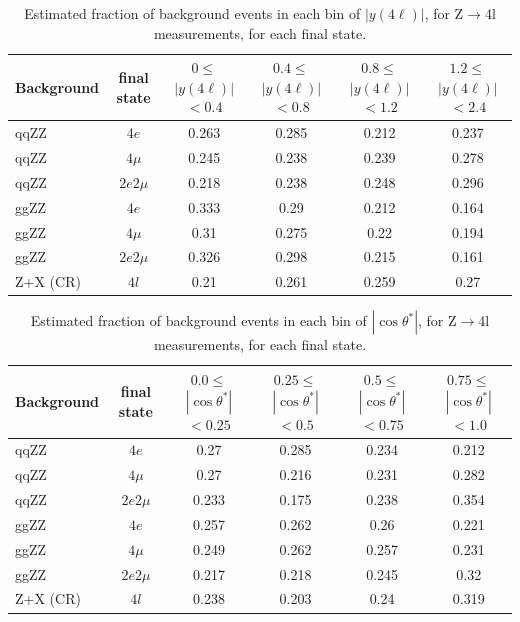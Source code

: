 \begin{table}[!h!tb]  
\begin{center}  
\small  
    \caption{  
        Estimated fraction of background events in each bin of $|y(4\ell)|$, for Z$\to$4l measurements, for each final state.  
\label{tab:z4l_fractions_rapidity4l}  
}  
\begin{tabular}{|l|c|c|c|c|c|}  
\hline  
Background & final state & $0\leq$$|y(4\ell)|$$<0.4$ & $0.4\leq$$|y(4\ell)|$$<0.8$ & $0.8\leq$$|y(4\ell)|$$<1.2$ & $1.2\leq$$|y(4\ell)|$$<2.4$ \\ \hline  
qqZZ& $4e$  & 0.263 & 0.285 & 0.212 & 0.237  \\
qqZZ& $4\mu$  & 0.245 & 0.238 & 0.239 & 0.278  \\
qqZZ& $2e2\mu$  & 0.218 & 0.238 & 0.248 & 0.296  \\
ggZZ& $4e$  & 0.333 & 0.29 & 0.212 & 0.164  \\
ggZZ& $4\mu$  & 0.31 & 0.275 & 0.22 & 0.194  \\
ggZZ& $2e2\mu$  & 0.326 & 0.298 & 0.215 & 0.161  \\
Z+X (CR)& $4l$  & 0.21 & 0.261 & 0.259 & 0.27  \\
\hline  
\end{tabular}  
\normalsize  
\end{center}  
\end{table}  

\begin{table}[!h!tb]  
\begin{center}  
\small  
    \caption{  
        Estimated fraction of background events in each bin of $|\cos \theta^{*}|$, for Z$\to$4l measurements, for each final state.  
\label{tab:z4l_fractions_cosThetaStar}  
}  
\begin{tabular}{|l|c|c|c|c|c|}  
\hline  
Background & final state & $0.0\leq$$|\cos \theta^{*}|$$<0.25$ & $0.25\leq$$|\cos \theta^{*}|$$<0.5$ & $0.5\leq$$|\cos \theta^{*}|$$<0.75$ & $0.75\leq$$|\cos \theta^{*}|$$<1.0$ \\ \hline  
qqZZ& $4e$  & 0.27 & 0.285 & 0.234 & 0.212  \\
qqZZ& $4\mu$  & 0.27 & 0.216 & 0.231 & 0.282  \\
qqZZ& $2e2\mu$  & 0.233 & 0.175 & 0.238 & 0.354  \\
ggZZ& $4e$  & 0.257 & 0.262 & 0.26 & 0.221  \\
ggZZ& $4\mu$  & 0.249 & 0.262 & 0.257 & 0.231  \\
ggZZ& $2e2\mu$  & 0.217 & 0.218 & 0.245 & 0.32  \\
Z+X (CR)& $4l$  & 0.238 & 0.203 & 0.24 & 0.319  \\
\hline  
\end{tabular}  
\normalsize  
\end{center}  
\end{table} 

